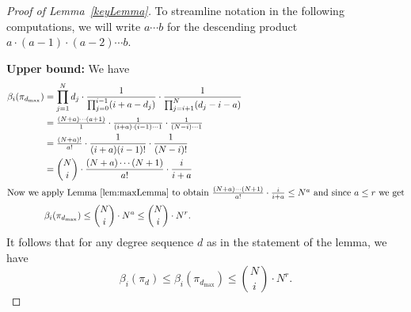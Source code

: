 \documentclass[12pt]{amsart}
\theoremstyle{remark}
\begin{document}
\begin{proof}[Proof of Lemma~\ref{keyLemma}]
To streamline notation in the following computations, we will write $a \cdots b$ for the descending product $a\cdot (a-1)\cdot (a-2)\cdots b$.  


{\bf Upper bound:} We have
\begin{align*}
\beta_i(\pi_{d_{\max}})&=
 \prod_{j=1}^N d_j \cdot \frac{1}{\prod_{j=0}^{i-1} (i+a-d_j) } \cdot  \frac{1}{\prod_{j=i+1}^{N} (d_j-i-a)}\\
 &= \tfrac{(N+a)\cdots (a+1)}{1} \cdot \tfrac{1}{(i+a) \cdot (i-1)\cdots 1} \cdot \tfrac{1}{(N-i) \cdots 1}\\
 &=\tfrac{(N+a)!}{a!} \cdot  \frac{1}{(i+a)(i-1)!} \cdot \frac{1}{(N-i)!}\\
 &= \binom{N}{i} \cdot \frac{(N+a)\cdots (N+1)}{a!} \cdot \frac{i}{i+a}\\
 \intertext{Now we apply Lemma~\ref{lem:maxLemma} to obtain $\frac{(N+a)\cdots (N+1)}{a!} \cdot \frac{i}{i+a}\leq N^a$ and since $a\leq r$ we get}
 &\beta_i(\pi_{d_{\max}})\leq \binom{N}{i} \cdot N^a \leq \binom{N}{i}\cdot N^r.
\end{align*}
It follows that for any degree sequence $d$ as in the statement of the lemma, we have
\[
\beta_i(\pi_d) \leq \beta_i(\pi_{d_{\max}}) \leq \binom{N}{i}\cdot N^r.
\]




\end{proof}
\end{document}
